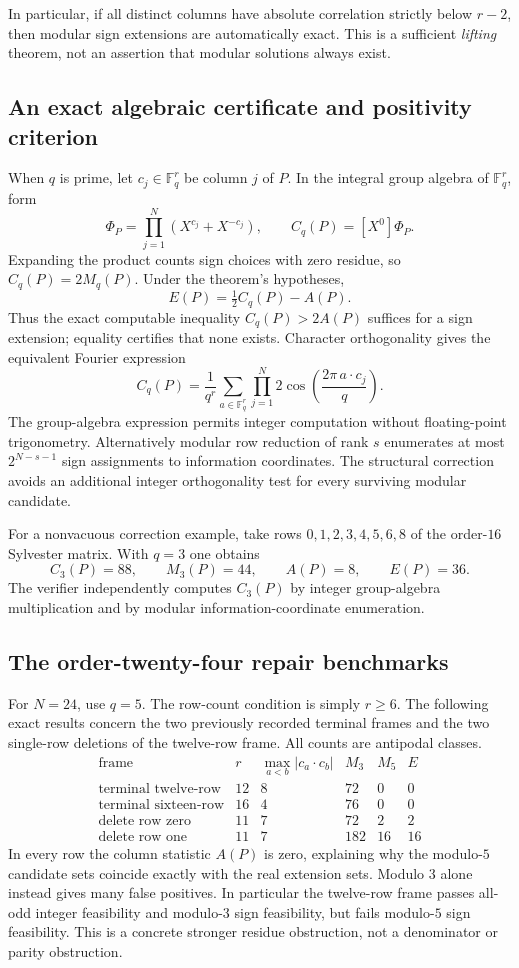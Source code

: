 \documentclass[11pt]{article}
\begin{document}
In particular, if all distinct columns have absolute correlation
strictly below $r-2$, then modular sign extensions are automatically
exact. This is a sufficient \emph{lifting} theorem, not an assertion
that modular solutions always exist.

\subsection{An exact algebraic certificate and positivity criterion}
When $q$ is prime, let $c_j\in\mathbb F_q^r$ be column $j$ of $P$.
In the integral group algebra of $\mathbb F_q^r$, form
\[
 \Phi_P=\prod_{j=1}^N(X^{c_j}+X^{-c_j}),\qquad
 C_q(P)=[X^0]\Phi_P.
\]
Expanding the product counts sign choices with zero residue, so
$C_q(P)=2M_q(P)$. Under the theorem's hypotheses,
\[
 \boxed{E(P)=\tfrac12 C_q(P)-A(P).}
\]
Thus the exact computable inequality $C_q(P)>2A(P)$ suffices for a
sign extension; equality certifies that none exists. Character
orthogonality gives the equivalent Fourier expression
\[
 C_q(P)=\frac1{q^r}\sum_{a\in\mathbb F_q^r}
          \prod_{j=1}^N2\cos\left(\frac{2\pi\,a\cdot c_j}{q}\right).
\]
The group-algebra expression permits integer computation without
floating-point trigonometry. Alternatively modular row reduction of
rank $s$ enumerates at most $2^{N-s-1}$ sign assignments to information
coordinates. The structural correction avoids an additional integer
orthogonality test for every surviving modular candidate.

For a nonvacuous correction example, take rows $0,1,2,3,4,5,6,8$ of
the order-$16$ Sylvester matrix. With $q=3$ one obtains
\[
 C_3(P)=88,\qquad M_3(P)=44,\qquad A(P)=8,\qquad E(P)=36.
\]
The verifier independently computes $C_3(P)$ by integer group-algebra
multiplication and by modular information-coordinate enumeration.

\subsection{The order-twenty-four repair benchmarks}
For $N=24$, use $q=5$. The row-count condition is simply $r\ge6$.
The following exact results concern the two previously recorded
terminal frames and the two single-row deletions of the twelve-row
frame. All counts are antipodal classes.
\[
\begin{array}{c|r|r|r|r|r}
\text{frame}&r&\max_{a<b}|c_a\cdot c_b|&M_3&M_5&E\\\hline
\text{terminal twelve-row}&12&8&72&0&0\\
\text{terminal sixteen-row}&16&4&76&0&0\\
\text{delete row zero}&11&7&72&2&2\\
\text{delete row one}&11&7&182&16&16
\end{array}
\]
In every row the column statistic $A(P)$ is zero, explaining why the
modulo-$5$ candidate sets coincide exactly with the real extension
sets. Modulo $3$ alone instead gives many false positives. In
particular the twelve-row frame passes all-odd integer feasibility
and modulo-$3$ sign feasibility, but fails modulo-$5$ sign feasibility.
This is a concrete stronger residue obstruction, not a denominator
or parity obstruction.
\end{document}
